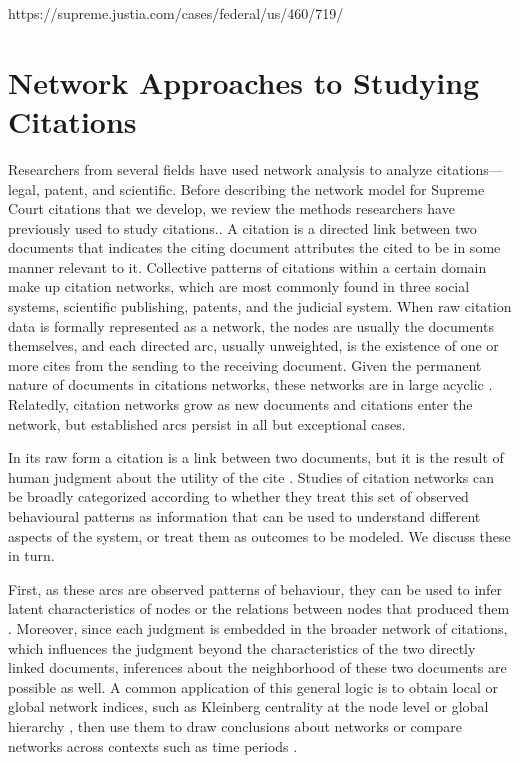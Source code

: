 \documentclass[headsepline=true, abstracton]{scrartcl}
\begin{document}
https://supreme.justia.com/cases/federal/us/460/719/

\section{Network Approaches to Studying Citations}

Researchers from several fields have used network analysis to analyze citations---legal, patent, and scientific. Before describing the network model for Supreme Court citations that we develop, we review the methods researchers have previously used to study citations.. A citation is a directed link between two documents that indicates the citing document attributes the cited to be in some manner relevant to it. Collective patterns of citations within a certain domain make up citation networks, which are most commonly found in three social systems, scientific publishing, patents, and the judicial system. When raw citation data is formally represented as a network, the nodes are usually the documents themselves, and each directed arc, usually unweighted, is the existence of one or more cites from the sending to the receiving document. Given the permanent nature of documents in citations networks, these networks are in large acyclic \citep{leicht2007large,karrer2009random}. Relatedly, citation networks grow as new documents and citations enter the network, but established arcs persist in all but exceptional cases. 
	
	In its raw form a citation is a link between two documents, but it is the result of human judgment about the utility of the cite \citep{fowler2008authority}. Studies of citation networks can be broadly categorized according to whether they treat this set of observed behavioural patterns as information that can be used to understand different aspects of the system, or treat them as outcomes to be modeled. We discuss these in turn.
	
	First, as these arcs are observed patterns of behaviour, they can be used to infer latent characteristics of nodes or the relations between nodes that produced them \citep{batagelj2003efficient}. Moreover, since each judgment is embedded in the broader network of citations, which influences the judgment beyond the characteristics of the two directly linked documents, inferences about the neighborhood of these two documents are possible as well. A common application of this general logic is to obtain local or global network indices, such as Kleinberg centrality at the node level \citep{kleinberg1999authoritative,fowler2007network} or global hierarchy \citep{mones2014universal}, then use them to draw conclusions about networks or compare networks across contexts such as time periods \citep[e.g.][]{vazquez2001statistics,fowler2008authority,greenberg2009citation,lupu2012precedent,lupu2013strategic,dawson2014current,jaffe2017patent}.
	
\end{document}
